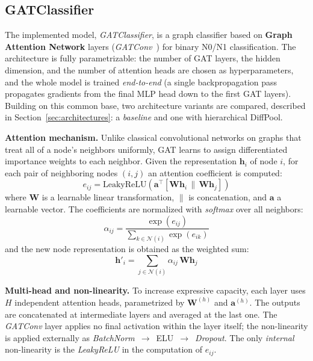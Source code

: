 \documentclass[10pt,a4paper,twocolumn,twoside]{article}
\begin{document}
\subsection{GATClassifier}

The implemented model, \textit{GATClassifier}, is a graph classifier based on
\textbf{Graph Attention Network} layers (\textit{GATConv}~\cite{veličković2018graphattentionnetworks,fey2019fastgraphrepresentationlearning})
for binary N0/N1 classification. The architecture is fully parametrizable: the number of
GAT layers, the hidden dimension, and the number of attention heads are chosen as hyperparameters, and the
whole model is trained \textit{end-to-end} (a single backpropagation pass propagates gradients
from the final MLP head down to the first GAT layers). Building on this common base, two
architecture variants are compared, described in Section~\ref{sec:architectures}: a \textit{baseline} and one
with hierarchical DiffPool.

\textbf{Attention mechanism.} Unlike classical convolutional networks on graphs that treat
all of a node's neighbors uniformly, GAT learns to assign differentiated importance weights to each
neighbor. Given the representation $\mathbf{h}_i$ of node $i$, for each pair of neighboring
nodes $(i, j)$ an attention coefficient is computed:
\begin{equation*}
  e_{ij} = \text{LeakyReLU}\!\left(\mathbf{a}^{\top}[\mathbf{W}\mathbf{h}_i \,\|\, \mathbf{W}\mathbf{h}_j]\right)
\end{equation*}
where $\mathbf{W}$ is a learnable linear transformation, $\|$ is concatenation, and $\mathbf{a}$ a
learnable vector. The coefficients are normalized with \textit{softmax} over all neighbors:
\begin{equation*}
  \alpha_{ij} = \frac{\exp(e_{ij})}{\sum_{k \in \mathcal{N}(i)} \exp(e_{ik})}
\end{equation*}
and the new node representation is obtained as the weighted sum:
\begin{equation*}
  \mathbf{h}'_i = \sum_{j \in \mathcal{N}(i)} \alpha_{ij}\,\mathbf{W}\mathbf{h}_j
\end{equation*}

\textbf{Multi-head and non-linearity.} To increase expressive capacity, each layer uses $H$ independent
attention heads, parametrized by $\mathbf{W}^{(h)}$ and $\mathbf{a}^{(h)}$.
The outputs are concatenated at intermediate layers and averaged at the last one. The
\textit{GATConv} layer applies no final activation within the layer itself; the non-linearity is applied externally
as \textit{BatchNorm}~$\to$~ELU~$\to$~\textit{Dropout}. The only \textit{internal} non-linearity is
the \textit{LeakyReLU} in the computation of $e_{ij}$.
\end{document}
